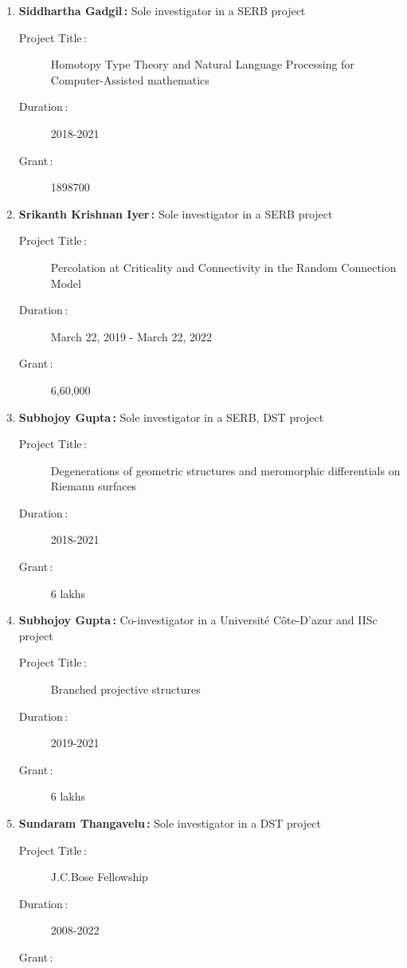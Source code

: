 \begin{enumerate}
\item {\bf Siddhartha Gadgil\,:} Sole investigator in a SERB project
\begin{description}
  \item[Project Title\,:] Homotopy Type Theory and Natural Language Processing for Computer-Assisted mathematics
  \item[Duration\,:] 2018-2021
  \item[Grant\,:] 1898700
\end{description}


\item {\bf Srikanth Krishnan Iyer\,:} Sole investigator in a SERB project
\begin{description}
  \item[Project Title\,:] Percolation at Criticality and Connectivity in the Random Connection Model
  \item[Duration\,:] March 22, 2019 - March 22, 2022
  \item[Grant\,:] 6,60,000
\end{description}


\item {\bf Subhojoy Gupta\,:} Sole investigator in a SERB, DST project
\begin{description}
  \item[Project Title\,:] Degenerations of geometric structures and meromorphic differentials on Riemann surfaces
  \item[Duration\,:] 2018-2021
  \item[Grant\,:] 6 lakhs
\end{description}


\item {\bf Subhojoy Gupta\,:} Co-investigator in a Université Côte-D'azur and IISc  project
\begin{description}
  \item[Project Title\,:] Branched projective structures
  \item[Duration\,:] 2019-2021
  \item[Grant\,:] 6 lakhs
\end{description}


\item {\bf Sundaram Thangavelu\,:} Sole investigator in a DST project
\begin{description}
  \item[Project Title\,:] J.C.Bose Fellowship
  \item[Duration\,:] 2008-2022
  \item[Grant\,:] 
\end{description}



\end{enumerate}
